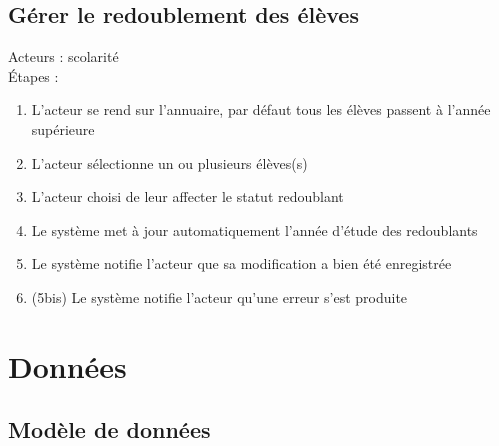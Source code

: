 \documentclass{scrreprt}
\begin{document}
\subsection{Gérer le redoublement des élèves}
Acteurs : scolarité
\\
\'Etapes :
\begin{enumerate}
\item L’acteur se rend sur l’annuaire, par défaut tous les élèves passent à l’année supérieure
\item L’acteur sélectionne un ou plusieurs élèves(s)
\item L’acteur choisi de leur affecter le statut redoublant
\item Le système met à jour automatiquement l’année d’étude des redoublants
\item Le système notifie l’acteur que sa modification a bien été enregistrée 
\item (5bis) Le système notifie l’acteur qu’une erreur s’est produite
\end{enumerate}



\section{Donn\'ees}
\subsection{Mod\`ele de donn\'ees}
\end{document}
